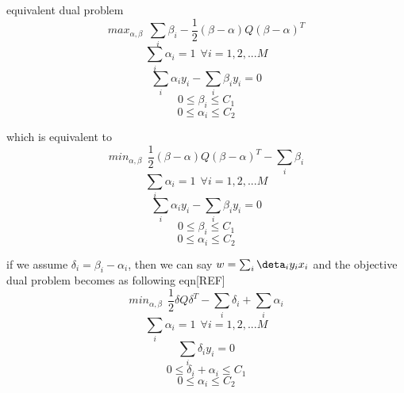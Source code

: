 equivalent dual problem
\begin{equation}\label{mcmeq1}
max_{\alpha,\beta}\:\: \sum_i{\beta_i} -  \frac{1}{2}(\beta - \alpha)Q(\beta - \alpha)^T
\end{equation}
\begin{equation}\label{mcmeq4}
\sum_i{\alpha_i} = 1 \:\:\forall i={1, 2, ... M}
\end{equation}
\begin{equation}
\sum_i{\alpha_iy_i} - \sum_i{\beta_iy_i} = 0
\end{equation}
\begin{equation}\label{mcmeq2}
0 \leq \beta_i \leq C_1
\end{equation}
\begin{equation}\label{mcmeq3}
0 \leq \alpha_i \leq C_2
\end{equation}

which is equivalent to
\begin{equation}\label{mcmeq1}
min_{\alpha,\beta}\:\: \frac{1}{2}(\beta - \alpha)Q(\beta - \alpha)^T - \sum_i{\beta_i}
\end{equation}
\begin{equation}\label{mcmeq4}
\sum_i{\alpha_i} = 1 \:\:\forall i={1, 2, ... M}
\end{equation}
\begin{equation}
\sum_i{\alpha_iy_i} - \sum_i{\beta_iy_i} = 0
\end{equation}
\begin{equation}\label{mcmeq2}
0 \leq \beta_i \leq C_1
\end{equation}
\begin{equation}\label{mcmeq3}
0 \leq \alpha_i \leq C_2
\end{equation}


if we assume $\delta_i = \beta_i - \alpha_i$, then we can say $w = \sum_i{\deta_iy_ix_i}$ and the objective dual problem becomes as following eqn[REF]
\begin{equation}\label{mcmeq1}
min_{\alpha,\beta}\:\: \frac{1}{2}\delta Q \delta^T - \sum_i{\delta_i} +\sum_i{\alpha_i}
\end{equation}
\begin{equation}\label{mcmeq4}
\sum_i{\alpha_i} = 1 \:\:\forall i={1, 2, ... M}
\end{equation}
\begin{equation}
\sum_i{\delta_iy_i} = 0
\end{equation}
\begin{equation}\label{mcmeq2}
0 \leq \delta_i + \alpha_i \leq C_1
\end{equation}
\begin{equation}\label{mcmeq3}
0 \leq \alpha_i \leq C_2
\end{equation}


